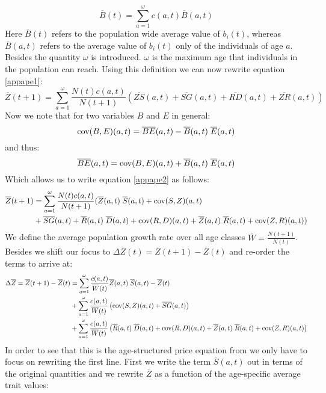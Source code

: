 \begin{equation}
\overline{B}(t) = \sum_{a=1}^{\omega} c(a,t) \overline{B}(a,t)
\end{equation}
Here $\overline{B}(t)$ refers to the population wide average value of $b_i(t)$, whereas $\overline{B}(a,t)$ refers to the average value of $b_i(t)$ only of the individuals of age $a$. Besides the quantity $\omega$ is introduced. $\omega$ is the maximum age that individuals in the population can reach. Using this definition we can now rewrite equation \ref{appape1}:
\begin{equation}
\overline{Z}(t+1) = \sum_{a=1}^{\omega} \frac{N(t)c(a,t)}{N(t+1)} \left( \overline{ZS}(a,t) + \overline{SG}(a,t) + \overline{RD}(a,t) + \overline{ZR}(a,t) \right)
\label{appape2}
\end{equation}
Now we note that for two variables $B$ and $E$ in general:
\begin{equation}
\text{cov}(B,E)(a,t) = \overline{BE}(a,t) - \overline{B}(a,t)\;\overline{E}(a,t)
\end{equation}
and thus:
\begin{equation}
\overline{BE}(a,t) = \text{cov}(B,E)(a,t) + \overline{B}(a,t)\;\overline{E}(a,t)
\end{equation}
Which allows us to write equation \ref{appape2} as follows:
\begin{align}
\overline{Z}(t+1) & = \sum_{a=1}^{\omega} \frac{N(t)c(a,t)}{N(t+1)} ( \overline{Z}(a,t)\;\overline{S}(a,t) + \text{cov}(S,Z)(a,t) \\ & + \overline{SG}(a,t) + \overline{R}(a,t)\;\overline{D}(a,t) + \text{cov}(R,D)(a,t) + \overline{Z}(a,t)\;\overline{R}(a,t) + \text{cov}(Z,R)(a,t) ) \notag
\label{appape3}
\end{align}
We define the average population growth rate over all age classes $\overline{W}=\frac{N(t+1)}{N(t)}$. Besides we shift our focus to $\Delta \overline{Z}(t) = \overline{Z}(t+1) - \overline{Z}(t)$ and re-order the terms to arrive at:
\begin{align}
\Delta \overline{Z} = \overline{Z}(t+1) - \overline{Z}(t) & = \sum_{a=1}^{\omega} \frac{c(a,t)}{\overline{W}(t)} \overline{Z}(a,t)\;\overline{S}(a,t) - \overline{Z}(t) \\ & + \sum_{a=1}^{\omega} \frac{c(a,t)}{\overline{W}(t)} \left( \text{cov}(S,Z)(a,t)  + \overline{SG}(a,t)\right) \notag \\ & + \sum_{a=1}^{\omega} \frac{c(a,t)}{\overline{W}(t)} \left( \overline{R}(a,t)\;\overline{D}(a,t) + \text{cov}(R,D)(a,t) + \overline{Z}(a,t)\;\overline{R}(a,t) + \text{cov}(Z,R)(a,t) \right) \notag
\label{appape4}
\end{align}
In order to see that this is the age-structured price equation from \citet{Coulson2008} we only have to focus on rewriting the first line. First we write the term $\overline{S}(a,t)$ out in terms of the original quantities and we rewrite $\overline{Z}$ as a function of the age-specific average trait values:
